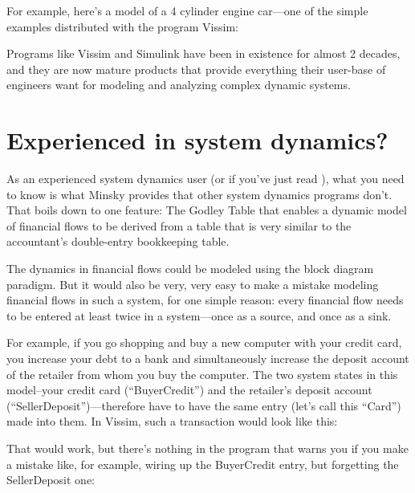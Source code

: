 For example, here's a model of a 4 cylinder engine car---one of the
simple examples distributed with the program Vissim:

\begin{center}
\end{center}

Programs like Vissim and Simulink have been in existence for almost 2
decades, and they are now mature products that provide everything
their user-base of engineers want for modeling and analyzing complex
dynamic systems. 

\section{Experienced in system dynamics?}
\label{intro:experienced}

As an experienced system dynamics user (or if you've just read ), what you need to know is what Minsky
provides that other system dynamics programs don't. That boils down to
one feature: The Godley Table that enables a dynamic model of
financial flows to be derived from a table that is very similar to the
accountant's double-entry bookkeeping table.


The dynamics in financial flows could be modeled using the block diagram
paradigm. But it would also be very, very easy to make a mistake
modeling financial flows in such a system, for one simple reason:
every financial flow needs to be entered at least twice in a
system---once as a source, and once as a sink.


For example, if you go shopping and buy a new computer with your
credit card, you increase your debt to a bank and simultaneously
increase the deposit account of the retailer from whom you buy the
computer. The two system states in this model--your credit card
(``BuyerCredit'') and the retailer's deposit account
(``SellerDeposit'')---therefore have to have the same entry (let's call
this ``Card'') made into them. In Vissim, such a transaction would look
like this:


\begin{center}
\end{center}

That would work, but there's nothing in the program that warns you if
you make a mistake like, for example, wiring up the BuyerCredit entry,
but forgetting the SellerDeposit one:

